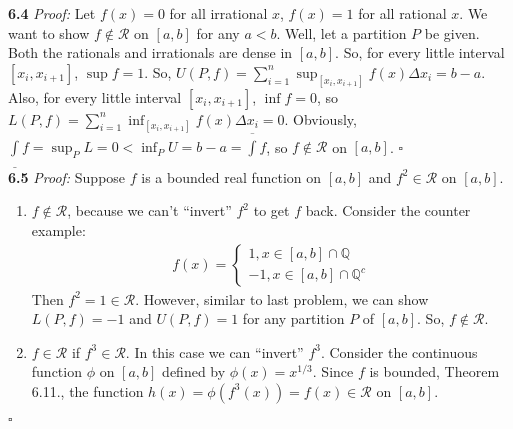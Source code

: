 \documentclass[11pt]{article}
\begin{document}
\noindent \textbf{6.4}
\noindent \textit{Proof:} Let $f(x) = 0$ for all irrational $x$, $f(x) = 1$ for all rational $x$. We want to show $f \notin \mathscr{R}$ on $[a,b]$ for any $a<b$. Well, let a partition $P$ be given. Both the rationals and irrationals are dense in $[a,b]$. So, for every little interval $[x_i,x_{i+1}]$, $\sup f = 1$. So, $U(P,f) = \sum^n_{i=1}\sup_{[x_i,x_{i+1}]} f(x)\Delta x_i = b-a$. Also, for every little interval $[x_i,x_{i+1}]$, $\inf f  =0$, so $L(P,f) = \sum^n_{i=1} \inf_{[x_i,x_{i+1}]} f(x) \Delta x_i = 0$. Obviously, $\underline{\int}f = \sup_P L = 0 < \inf_P U = b-a = \overline{\int}f$, so $f \notin \mathscr{R}$ on $[a,b]$. \hfill $\square$ \\


\noindent \textbf{6.5}
\noindent \textit{Proof:} Suppose $f$ is a bounded real function on $[a,b]$ and $f^2 \in \mathscr{R}$ on $[a,b]$. 
\begin{enumerate}
	\item $f\notin \mathscr{R}$, because we can't ``invert'' $f^2$ to get $f$ back. Consider the counter example: 
	\begin{align*}
	f(x) = \begin{cases}
	1, x \in [a,b] \cap \mathbb{Q}\\
	-1, x \in [a,b] \cap \mathbb{Q}^c
	\end{cases}
	\end{align*}
	Then $f^2 = 1 \in \mathscr{R}$. However, similar to last problem, we can show $L(P,f) = -1$ and $U(P,f) = 1$ for any partition $P$ of $[a,b]$. So, $f \notin \mathscr{R}$.  
	
	\item $f\in \mathscr{R}$ if $f^3 \in \mathscr{R}$. In this case we can ``invert'' $f^3$. Consider the continuous function $\phi$ on $[a,b]$ defined by $\phi(x) = x^{1/3}$. Since $f$ is bounded, Theorem 6.11., the function $h(x) = \phi(f^3(x)) = f(x) \in \mathscr{R}$ on $[a,b]$. 
\end{enumerate}
\hfill $\square$\\
\end{document}
